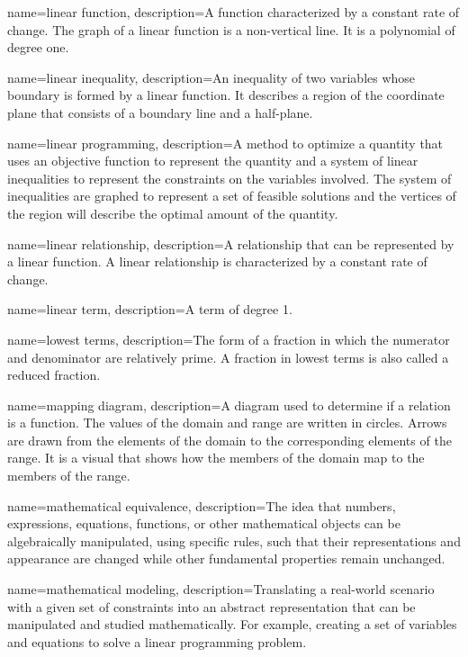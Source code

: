  {
	name=linear function,
	description={A function characterized by a constant rate of change. The graph of a linear function is a non-vertical line. It is a polynomial of degree one.}
}

 {
	name=linear inequality,
	description={An inequality of two variables whose boundary is formed by a linear function. It describes a region of the coordinate plane that consists of a boundary line and a half-plane.}
}

 {
	name=linear programming,
	description={A method to optimize a quantity that uses an objective function to represent the quantity and a system of linear inequalities to represent the constraints on the variables involved. The system of inequalities are graphed to represent a set of feasible solutions and the vertices of the region will describe the optimal amount of the quantity.}
}

 {
	name=linear relationship,
	description={A relationship that can be represented by a linear function. A linear relationship is characterized by a constant rate of change.}
}

 {
	name=linear term,
	description={A term of degree 1.}
}

 {
	name=lowest terms,
	description={The form of a fraction in which the numerator and denominator are \gls{relatively prime}. A fraction in lowest terms is also called a reduced fraction.}
}

 {
	name=mapping diagram,
	description={A diagram used to determine if a relation is a function. The values of the domain and range are written in circles. Arrows are drawn from the elements of the domain to the corresponding elements of the range. It is a visual that shows 
how the members of the domain map to the members of the range.}
}

 {
	name=mathematical equivalence,
	description={The idea that numbers, expressions, equations, functions, or other mathematical objects can be algebraically manipulated, using specific rules, such that their representations and appearance are changed while other fundamental properties remain unchanged.}
}

 {
	name=mathematical modeling,
	description={Translating a real-world scenario with a given set of constraints into an abstract representation that can be manipulated and studied mathematically. For example, creating a set of variables and equations to solve a \gls{linear programming} problem.}
}

